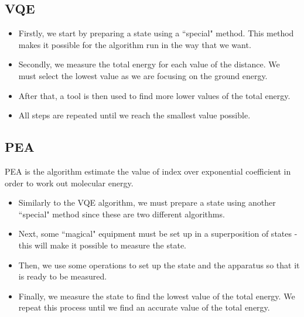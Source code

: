 \documentclass[14pt,landscape,color=UCLdarkred,margin=3cm]{uclposter}
\begin{document}
\begin{multicols}{3}
\begin{figure}[H]
   
\end{figure}




\subsection*{VQE}
\begin{highlightbox}
  \begin{itemize}
\item Firstly, we start by preparing a state using a ``special" method. This method makes it possible for the algorithm run in the way that we want.
\item Secondly, we measure the total energy for each value of the distance. We must select the lowest value as we are focusing on the ground energy.
\item After that, a tool is then used to find more lower values of the total energy.
\item All steps are repeated until we reach the smallest value possible.
\end{itemize}
\end{highlightbox}

\subsection*{PEA}


PEA is the algorithm estimate the value of index over exponential coefficient in order to work out molecular energy.

\begin{highlightbox}
\begin{itemize}
\item Similarly to the VQE algorithm, we must prepare a state using another ``special" method since these are two different algorithms. 
\item Next, some ``magical" equipment must be set up in a superposition of states - this will make it possible to measure the state.
\item Then, we use some operations to set up the state and the apparatus so that it is ready to be measured. 
\item Finally, we measure the state to find the lowest value of the total energy. We repeat this process until we find an accurate value of the total energy.
\end{itemize}
\end{highlightbox}




\end{multicols}
\end{document}
